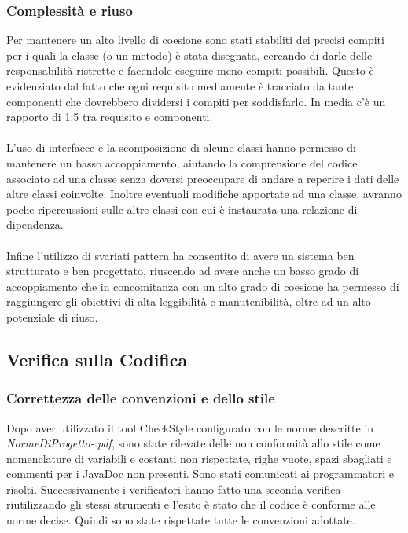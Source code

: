 \subsubsection*{Complessit\`a e riuso}
Per mantenere un alto livello di coesione sono stati stabiliti dei precisi
compiti per i quali la classe (o un metodo) \`e stata disegnata, cercando di
darle delle responsabilit\`a ristrette e facendole eseguire meno compiti
possibili. Questo \`e evidenziato dal fatto che ogni requisito mediamente \`e
tracciato da tante componenti che dovrebbero dividersi i compiti per
soddisfarlo. In media c'\`e un rapporto di 1:5 tra requisito e componenti. \\\\
L'uso di interfacce e la scomposizione di alcune classi hanno permesso di
mantenere un basso accoppiamento, aiutando la comprensione del codice associato
ad una classe senza doversi preoccupare di andare a reperire i dati delle altre
classi coinvolte. Inoltre eventuali modifiche apportate ad una classe, avranno
poche ripercussioni sulle altre classi con cui \`e instaurata una relazione di
dipendenza. \\\\
Infine l'utilizzo di svariati pattern ha consentito di avere un sistema ben
strutturato e ben progettato, riuscendo ad avere anche un basso grado di
accoppiamento che in concomitanza con un alto grado di coesione ha permesso di
raggiungere gli obiettivi di alta leggibilit\`a e manutenibilit\`a, oltre ad un
alto potenziale di riuso.

\subsection{Verifica sulla Codifica}

\subsubsection*{Correttezza delle convenzioni e dello stile}
Dopo aver utilizzato il tool CheckStyle configurato con le norme descritte in
\emph{NormeDiProgetto-\versionenormeprogetto.pdf}, sono state rilevate delle non
conformit\`a allo stile come nomenclature di variabili e costanti non
rispettate, righe vuote, spazi sbagliati e commenti per i JavaDoc non presenti.
Sono stati comunicati ai programmatori e risolti. Successivamente i verificatori
hanno fatto una seconda verifica riutilizzando gli stessi strumenti e l'esito
\`e stato che il codice \`e conforme alle norme decise. Quindi sono state
rispettate tutte le convenzioni adottate.

